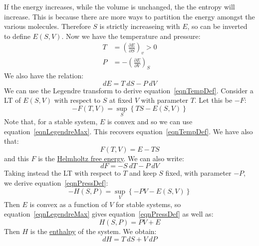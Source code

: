 \documentclass[../Main.tex]{subfiles}
\begin{document}
If the energy increases, while the volume is unchanged, the the entropy will increase. This is because there are more ways to partition the energy amongst the various molecules. Therefore $S$ is strictly increaseing with $E$, so can be inverted to define $E(S, V)$. Now we have the temperature and pressure:
\begin{align}
    T &= \left(\frac{\partial E}{\partial S}\right)_v > 0 \label{eqnTempDef} \\
    P &= -\left(\frac{\partial E}{\partial V}\right)_S \label{eqnPressDef}
\end{align}
We also have the relation:
\begin{equation}
    dE = T~dS - P~dV
    \label{eqnThermoRelation}
\end{equation}
We can use the Legendre transform to derive equation~\ref{eqnTempDef}. Consider a LT of $E(S, V)$ with respect to $S$ at fixed $V$ with parameter $T$. Let this be $-F$:
\begin{equation*}
    -F(T, V) = \sup_S \left\{TS - E(S, V)\right\}
\end{equation*}
Note that, for a stable system, $E$ is convex and so we can use equation~\ref{eqnLegendreMax}. This recovers equation~\ref{eqnTempDef}. We have also that:
\begin{equation}
    F(T, V) = E - TS
    \label{eqnHFreeEnergy}
\end{equation}
and this $F$ is the \underline{Helmholtz free energy}. We can also write:
\begin{equation*}
    dF = -S~dT - P~dV
\end{equation*}
Taking instead the LT with respect to $T$ and keep $S$ fixed, with parameter $-P$, we derive equation~\ref{eqnPressDef}:
\begin{equation*}
    -H(S, P) = \sup_V \left\{-PV - E(S, V)\right\}
\end{equation*}
Then $E$ is convex as a function of $V$ for stable systems, so equation~\ref{eqnLegendreMax} gives equation~\ref{eqnPressDef} as well as:
\begin{equation*}
    H(S, P) = PV + E
\end{equation*}
Then $H$ is the \underline{enthalpy} of the system. We obtain:
\begin{equation}
    dH = T~dS + V~dP 
    \label{eqnEnthalphyDiff}
\end{equation}
\end{document}
